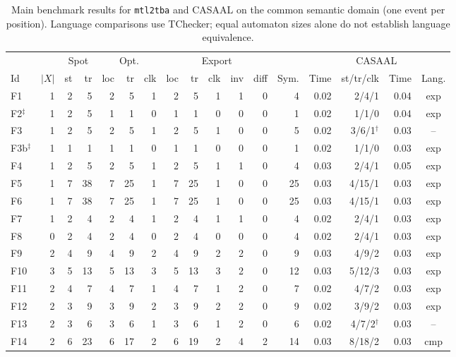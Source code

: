 \begin{table}[t]
\centering
\caption{Main benchmark results for \texttt{mtl2tba} and CASAAL on the common semantic domain (one event per position). Language comparisons use TChecker; equal automaton sizes alone do not establish language equivalence.}
\label{tab:evaluation}
\small
\setlength{\tabcolsep}{4.5pt}
\begin{tabular}{@{}lrrrrrrrrrrrrrrrc@{}}
\toprule
 & & \multicolumn{2}{c}{Spot} & \multicolumn{3}{c}{Opt.} & \multicolumn{5}{c}{Export} & & & \multicolumn{2}{c}{CASAAL} & \\
\cmidrule(lr){3-4}\cmidrule(lr){5-7}\cmidrule(lr){8-12}\cmidrule(lr){15-16}
Id & $|X|$ & st & tr & loc & tr & clk & loc & tr & clk & inv & diff & Sym. & Time & st/tr/clk & Time & Lang.\\
\midrule
F1 & 1 & 2 & 5 & 2 & 5 & 1 & 2 & 5 & 1 & 1 & 0 & 4 & 0.02 & 2/4/1 & 0.04 & exp\\
F2$^\ddagger$ & 1 & 2 & 5 & 1 & 1 & 0 & 1 & 1 & 0 & 0 & 0 & 1 & 0.02 & 1/1/0 & 0.04 & exp\\
F3 & 1 & 2 & 5 & 2 & 5 & 1 & 2 & 5 & 1 & 0 & 0 & 5 & 0.02 & 3/6/1$^\dagger$ & 0.03 & --\\
F3b$^\ddagger$ & 1 & 1 & 1 & 1 & 1 & 0 & 1 & 1 & 0 & 0 & 0 & 1 & 0.02 & 1/1/0 & 0.03 & exp\\
F4 & 1 & 2 & 5 & 2 & 5 & 1 & 2 & 5 & 1 & 1 & 0 & 4 & 0.03 & 2/4/1 & 0.05 & exp\\
F5 & 1 & 7 & 38 & 7 & 25 & 1 & 7 & 25 & 1 & 0 & 0 & 25 & 0.03 & 4/15/1 & 0.03 & exp\\
F6 & 1 & 7 & 38 & 7 & 25 & 1 & 7 & 25 & 1 & 0 & 0 & 25 & 0.03 & 4/15/1 & 0.03 & exp\\
F7 & 1 & 2 & 4 & 2 & 4 & 1 & 2 & 4 & 1 & 1 & 0 & 4 & 0.02 & 2/4/1 & 0.03 & exp\\
F8 & 0 & 2 & 4 & 2 & 4 & 0 & 2 & 4 & 0 & 0 & 0 & 4 & 0.02 & 2/4/1 & 0.03 & exp\\
F9 & 2 & 4 & 9 & 4 & 9 & 2 & 4 & 9 & 2 & 2 & 0 & 9 & 0.03 & 4/9/2 & 0.03 & exp\\
F10 & 3 & 5 & 13 & 5 & 13 & 3 & 5 & 13 & 3 & 2 & 0 & 12 & 0.03 & 5/12/3 & 0.03 & exp\\
F11 & 2 & 4 & 7 & 4 & 7 & 1 & 4 & 7 & 1 & 2 & 0 & 7 & 0.02 & 4/7/2 & 0.03 & exp\\
F12 & 2 & 3 & 9 & 3 & 9 & 2 & 3 & 9 & 2 & 2 & 0 & 9 & 0.02 & 3/9/2 & 0.03 & exp\\
F13 & 2 & 3 & 6 & 3 & 6 & 1 & 3 & 6 & 1 & 2 & 0 & 6 & 0.02 & 4/7/2$^\dagger$ & 0.03 & --\\
F14 & 2 & 6 & 23 & 6 & 17 & 2 & 6 & 19 & 2 & 4 & 2 & 14 & 0.03 & 8/18/2 & 0.03 & cmp\\

\end{tabular}
\end{table}
